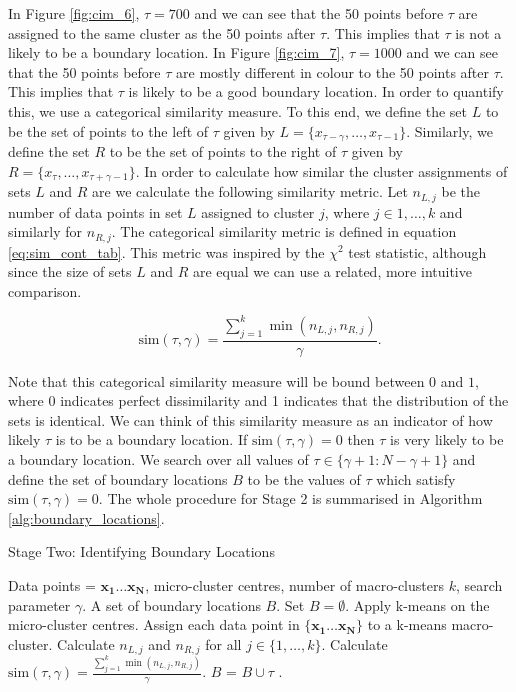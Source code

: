 In Figure \ref{fig:cim_6}, $\tau = 700$ and we can see that the 50 points before $\tau$ are assigned to the same cluster as the 50 points after $\tau$. This implies that $\tau$ is not a likely to be a boundary location. In Figure \ref{fig:cim_7}, $\tau = 1000$ and we can see that the 50 points before $\tau$ are mostly different in colour to the 50 points after $\tau$. This implies that $\tau$ is likely to be a good boundary location. In order to quantify this, we use a categorical similarity measure. To this end, we define the set $L$ to be the set of points to the left of $\tau$ given by $ L = \{x_{\tau - \gamma}, \ldots, x_{\tau -1}\}$. Similarly, we define the set $R$ to be the set of points to the right of $\tau$  given by $R = \{x_{\tau}, \ldots, x_{\tau + \gamma -1}\}$. In order to calculate how similar the cluster assignments of sets $L$ and $R$ are we calculate the following similarity metric. Let $n_{L,j}$ be the number of data points in set $L$ assigned to cluster $j$, where $j \in 1, \ldots, k$ and similarly for $n_{R,j}$. The categorical similarity metric is defined in equation \eqref{eq:sim_cont_tab}. This metric was inspired by the $\chi^2$ test statistic, although since the size of sets $L$ and $R$ are equal we can use a related, more intuitive comparison. 

\begin{equation}
  \label{eq:sim_cont_tab}
  \text{sim}(\tau, \gamma) = \frac{\sum_{j = 1}^{k} \min (n_{L,j}, n_{R,j})}{\gamma}.
\end{equation}
 
Note that this categorical similarity measure will be bound between $0$ and $1$, where 0 indicates perfect dissimilarity and 1 indicates that the distribution of the sets is identical.  We can think of this similarity measure as an indicator of how likely $\tau$ is to be a boundary location. If $\text{sim}(\tau, \gamma) = 0$ then $\tau$ is very likely to be a boundary location. We search over all values of $\tau \in \{\gamma+1 :  N-\gamma+1\}$ and define the set of boundary locations $B$ to be the values of $\tau$ which satisfy $\text{sim}(\tau, \gamma) = 0 $. The whole procedure for Stage 2 is summarised in Algorithm \ref{alg:boundary_locations}. 

\begin{algorithm}
\caption{Stage Two: Identifying Boundary Locations}  
\begin{algorithmic}[1]
\REQUIRE Data points =  $\boldsymbol{x_1} \ldots \boldsymbol{x_N}$, micro-cluster centres, number of macro-clusters $k$, search parameter $\gamma$.
\ENSURE A set of boundary locations $B$.
\STATE Set $B = \emptyset$. 
\STATE Apply k-means on the micro-cluster centres.
\STATE Assign each data point in  $\{\boldsymbol{x_1} \ldots \boldsymbol{x_N}\}$ to a k-means macro-cluster.
\STATE Calculate $n_{L,j}$ and $n_{R,j}$ for all $j \in \{1, \ldots, k\}$. 
\STATE Calculate $\text{sim}(\tau, \gamma) = \frac{\sum_{j = 1}^{k} \min (n_{L,j}, n_{R,j})}{\gamma}$. 
   \STATE $B$ = $B \cup \tau$ .
  \ENDIF
\ENDFOR
\end{algorithmic}
\label{alg:boundary_locations}
\end{algorithm}

